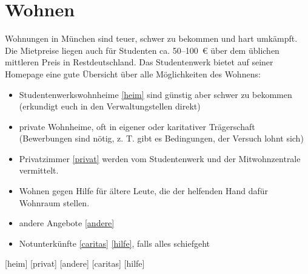\begin{urlList}
\end{urlList}

\section{Wohnen}
Wohnungen in München sind teuer, schwer zu bekommen und hart umkämpft. Die Mietpreise liegen
auch für Studenten ca. 50--100~€ über dem üblichen mittleren Preis in
Restdeutschland. Das Studentenwerk bietet auf seiner Homepage eine
gute Übersicht über alle Möglichkeiten des Wohnens:

\begin{itemize}
\item Studentenwerkswohnheime \ref{heim} sind 
	günstig aber schwer zu bekommen (erkundigt euch in den Verwaltungstellen direkt)
\item private Wohnheime, oft in eigener oder karitativer Trägerschaft
  (Bewerbungen sind nötig, z. T. gibt es Bedingungen, der Versuch lohnt sich)
\item
  Privatzimmer \ref{privat}
  werden vom Studentenwerk und der Mitwohnzentrale vermittelt.
\item Wohnen gegen Hilfe für ältere Leute, die der helfenden Hand dafür
  Wohnraum stellen.
\item andere Angebote \ref{andere}
\item Notunterkünfte \ref{caritas} \ref{hilfe}, falls alles schiefgeht
\end{itemize}

\begin{urlList}
	[heim]
	[privat]
	[andere]
	[caritas]
	[hilfe]
\end{urlList}

\newpage
 

